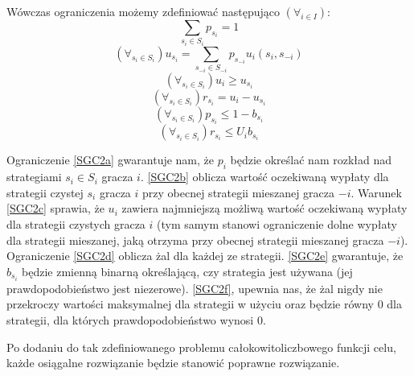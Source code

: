 \documentclass[polish]{standalone}
\begin{document}
Wówczas ograniczenia możemy zdefiniować następująco $(\forall_{i \in I})$:
\begin{equation}
\sum_{{s_i} \in S_i} p_{s_i} = 1 \label{SGC2a}
\end{equation}
\begin{equation}
(\forall_{s_i \in S_i}) u_{s_i} = \sum_{s_{-i} \in S_{-i}} p_{s_{-i}} u_i(s_i, s_{-i}) \label{SGC2b}
\end{equation}
\begin{equation}
(\forall_{s_i \in S_i}) u_i \geq u_{s_i} \label{SGC2c}
\end{equation}
\begin{equation}
(\forall_{s_i \in S_i}) r_{s_i} = u_i - u_{s_i} \label{SGC2d}
\end{equation}
\begin{equation}
(\forall_{s_i \in S_i}) p_{s_i} \leq 1-b_{s_i} \label{SGC2e}
\end{equation}
\begin{equation}
(\forall_{s_i \in S_i}) r_{s_i} \leq U_i b_{s_i} \label{SGC2f}
\end{equation}

Ograniczenie \ref{SGC2a} gwarantuje nam, że $p_i$ będzie określać nam rozkład nad strategiami $s_i \in S_i$ gracza $i$.
\ref{SGC2b} oblicza wartość oczekiwaną wypłaty dla strategii czystej $s_i$ gracza $i$ przy obecnej strategii mieszanej
gracza $-i$. Warunek \ref{SGC2c} sprawia, że $u_i$ zawiera najmniejszą możliwą wartość oczekiwaną wypłaty dla strategii
czystych gracza $i$ (tym samym stanowi ograniczenie dolne wypłaty dla strategii mieszanej, jaką otrzyma przy obecnej
strategii mieszanej gracza $-i$). Ograniczenie \ref{SGC2d} oblicza żal dla każdej ze strategii. \ref{SGC2e} gwarantuje,
że $b_{s_i}$ będzie zmienną binarną określającą, czy strategia jest używana (jej prawdopodobieństwo jest niezerowe).
\ref{SGC2f}, upewnia nas, że żal nigdy nie przekroczy wartości maksymalnej dla strategii w użyciu oraz będzie równy $0$
dla strategii, dla których prawdopodobieństwo wynosi $0$.

Po dodaniu do tak zdefiniowanego problemu całokowitoliczbowego funkcji celu, każde osiągalne rozwiązanie będzie stanowić
poprawne rozwiązanie. \cite[str.~2]{SCG-NE}
\end{document}
